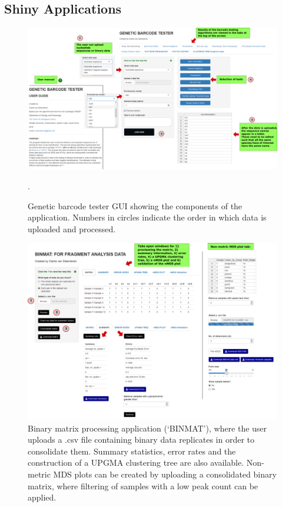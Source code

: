 \begin{landscape}
\section{Shiny Applications}
\begin{figure}[H]
	\centering
	\includegraphics[scale = 0.42]{Images/barcode_tester_gui.pdf}
    \newline
	\caption{Genetic barcode tester GUI showing the components of the application. Numbers in circles indicate the order in which data is uploaded and processed.}. 
	\label{fig:barcodeTesterGUI}
\end{figure}
\end{landscape}

\begin{landscape}
\begin{figure}[H]
	\centering
	\includegraphics[scale = 0.45]{Images/binmat_gui.pdf}
    \newline
	\caption{Binary matrix processing application (`BINMAT'), where the user uploads a .csv file containing binary data replicates in order to consolidate them. Summary statistics, error rates and the construction of a UPGMA clustering tree are also available. Non-metric MDS plots can be created by uploading a consolidated binary matrix, where filtering of samples with a low peak count can be applied.} 
	\label{fig:binmatGUI}
\end{figure}
\end{landscape}

